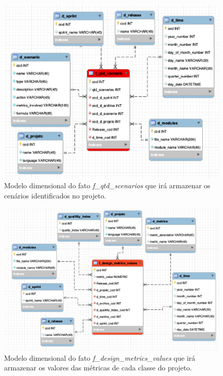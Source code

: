 \begin{figure}[H]
 	\centering
 		\includegraphics[scale=0.5]{figuras/dw-f-scenarios}
 		\caption{Modelo dimensional do fato \emph{f\_qtd\_scenarios} que irá armazenar os cenários identificados no projeto.}
 		\label{dw-model1}
 \end{figure}

 

 \begin{figure}[H]
 	\centering
 		\includegraphics[scale=0.5]{figuras/dw-fato-design-metrics}
 		\caption{Modelo dimensional do fato \emph{f\_design\_metrics\_values} que irá armazenar os valores das métricas de cada classe do projeto.}
 		\label{dw-model2}
 \end{figure}

